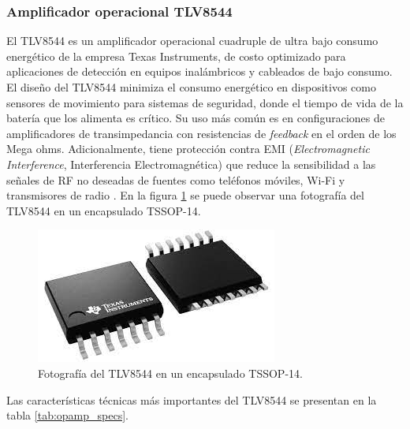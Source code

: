 \subsubsection{Amplificador operacional TLV8544}
El TLV8544 es un amplificador operacional cuadruple de ultra bajo consumo energético de la empresa Texas Instruments, de costo optimizado para aplicaciones de detección en equipos inalámbricos y cableados de bajo consumo. El diseño del TLV8544 minimiza el consumo energético en dispositivos como sensores de movimiento para sistemas de seguridad, donde el tiempo de vida de la batería que los alimenta es crítico. Su uso más común es en configuraciones de amplificadores de transimpedancia con resistencias de \textit{feedback} en el orden de los Mega ohms. Adicionalmente, tiene protección contra EMI (\textit{Electromagnetic Interference}, Interferencia Electromagnética) que reduce la sensibilidad a las señales de RF no deseadas de fuentes como teléfonos móviles, Wi-Fi y transmisores de radio \cite{opamp_info}. En la figura \ref{fig:opamp_photo} se puede observar una fotografía del TLV8544 en un encapsulado TSSOP-14.

\vspace*{50 px}

\begin{figure}[h]
	\centering
	\includegraphics[scale=0.4]{./Figures/opamp_photo.jpeg}
	\caption{Fotografía del TLV8544 en un encapsulado TSSOP-14\protect\footnotemark.}
	\label{fig:opamp_photo}
\end{figure}

Las características técnicas más importantes del TLV8544 se presentan en la tabla \ref{tab:opamp_specs}.

